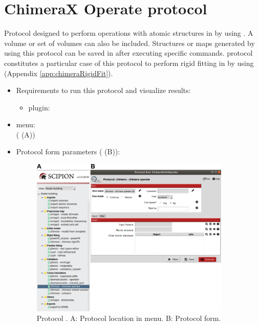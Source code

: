 \section{ChimeraX Operate protocol}
\label{app:chimeraOperate}%

Protocol designed to perform operations with atomic structures in \scipion by using \chimera. A volume or set of volumes can also be included. Structures or maps generated by using this protocol can be saved in \scipion after executing specific \chimera commands. \chimera {} protocol constitutes a particular case of this protocol to perform rigid fitting in \scipion by using \chimera (Appendix \ref{app:chimeraRigidFit}).

 \begin{itemize}
  \item Requirements to run this protocol and visualize results:
    \begin{itemize}
        \item \scipion plugin: 
    \end{itemize}
  \item \scipion menu:\\
    ( (A))
  
  \item Protocol form parameters ( (B)):
  
    \begin{figure}[H]
     \centering 
     \captionsetup{width=.7\linewidth} 
     \includegraphics[width=0.90\textwidth]{Images_appendix/Fig117.pdf}
     \caption{Protocol . A: Protocol location in \scipion menu. B: Protocol form.}
     \label{fig:app_protocol_chimera_2}
    \end{figure}
    

\end{itemize}
